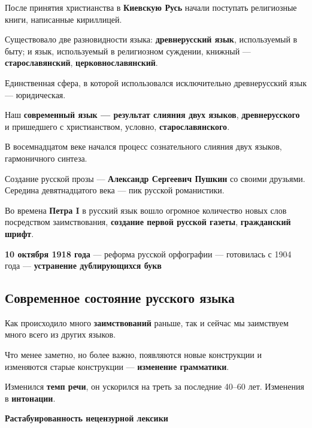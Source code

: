 \documentclass{article}
\begin{document}
После принятия христианства в \textbf{Киевскую Русь} начали поступать религиозные книги, написанные кириллицей.

Существовало две разновидности языка: \textbf{древнерусский язык}, используемый в быту; и язык, используемый в религиозном суждении, книжный — \textbf{старославянский}, \textbf{церковнославянский}.

Единственная сфера, в которой использовался исключительно древнерусский язык — юридическая.

\hfill

Наш \textbf{современный язык — результат слияния двух языков}, \textbf{древнерусского} и пришедшего с христианством, условно, \textbf{старославянского}.

В восемнадцатом веке начался процесс сознательного слияния двух языков, гармоничного синтеза.

Создание русской прозы — \textbf{Александр Сергеевич Пушкин} со своими друзьями. Середина девятнадцатого века — пик русской романистики.

\hfill

Во времена \textbf{Петра I} в русский язык вошло огромное количество новых слов посредством заимствования, \textbf{создание первой русской газеты}, \textbf{гражданский шрифт}.

\textbf{10 октября 1918 года} — реформа русской орфографии — готовилась с 1904 года — \textbf{устранение дублирующихся букв}

\subsection{Современное состояние русского языка}

Как происходило много \textbf{заимствований} раньше, так и сейчас мы заимствуем много всего из других языков.

Что менее заметно, но более важно, появляются новые конструкции и изменяются старые конструкции — \textbf{изменение грамматики}.

Изменился \textbf{темп речи}, он ускорился на треть за последние 40–60 лет. Изменения в \textbf{интонации}.

\textbf{Растабуированность нецензурной лексики}
\end{document}
